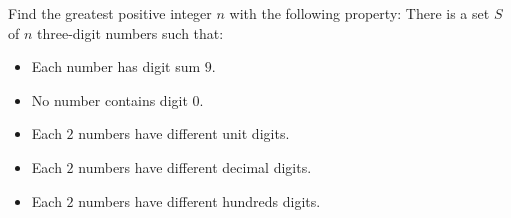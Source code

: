 Find the greatest positive integer $n$ with the following property:
There is a set $S$ of $n$ three-digit numbers such that:

\begin{itemize}
	\item Each number has digit sum $9$.
	\item No number contains digit $0$.
	\item Each $2$ numbers have different unit digits.
	\item Each $2$ numbers have different decimal digits.
	\item Each $2$ numbers have different hundreds digits.
\end{itemize}
